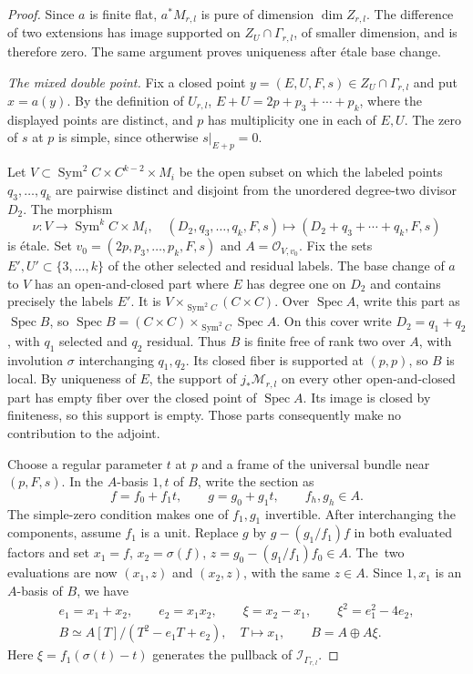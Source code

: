 \documentclass[11pt,letterpaper]{amsart}
\theoremstyle{plain}
\theoremstyle{definition}
\theoremstyle{remark}
\numberwithin{equation}{section}
\DeclareMathOperator{\Spec}{Spec}
\DeclareMathOperator{\Sym}{Sym}
\begin{document}
\begin{proof}
Since $a$ is finite flat, $a^*M_{r,l}$ is pure of dimension
$\dim Z_{r,l}$. The difference of two extensions has
image supported on $Z_U\cap\Gamma_{r,l}$, of smaller dimension,
and is therefore zero. The same argument proves uniqueness after
\'etale base change.

\smallskip
\noindent\textit{The mixed double point.}
Fix a closed point $y=(E,U,F,s)\in Z_U\cap\Gamma_{r,l}$
and put $x=a(y)$.
By the definition of $U_{r,l}$,
$
 E+U=2p+p_3+\cdots+p_k$,
where the displayed  points are distinct, and $p$ has
multiplicity one in each of $E,U$. The zero of $s$ at $p$ is
simple, since otherwise $s|_{E+p}=0$.

Let $V\subset\Sym^2C\times C^{k-2}\times M_i$ be the open subset
on which the labeled points $q_3,\ldots,q_k$ are pairwise distinct
and disjoint from the unordered degree-two divisor $D_2$.
The morphism
\[
 \nu:V\longrightarrow\Sym^kC\times M_i,\quad
 (D_2,q_3,\ldots,q_k,F,s)\longmapsto
 (D_2+q_3+\cdots+q_k,F,s)
\]
is \'etale. Set $v_0=(2p,p_3,\ldots,p_k,F,s)$ and
$A=\mathcal O_{V,v_0}$. Fix the sets $E',U'\subset\{3,\ldots,k\}$
of the other selected and residual labels.
The base change of $a$ to $V$ has an open-and-closed part where
$E$ has degree one on $D_2$ and contains precisely the labels $E'$.
It is $V\times_{\Sym^2C}(C\times C)$. Over $\Spec A$, write this part
as $\Spec B$, so
$
 \Spec B=(C\times C)\times_{\Sym^2C}\Spec A$.
On this cover write $D_2=q_1+q_2$, with $q_1$ selected and $q_2$
residual. Thus $B$ is finite free of rank two over $A$, with involution
$\sigma$ interchanging $q_1,q_2$. Its closed fiber is supported at
$(p,p)$, so $B$ is local.
By uniqueness of $E$, the support of $j_*\mathscr M_{r,l}$ on every
other open-and-closed part has empty fiber over the closed point of
$\Spec A$. Its image is closed by finiteness, so this support is
empty. Those parts consequently make no contribution to the adjoint.


Choose a regular parameter $t$ at $p$ and a frame of the universal
bundle near $(p,F,s)$. In the $A$-basis $1,t$ of $B$, write the section as
\[
 f=f_0+f_1t,\qquad g=g_0+g_1t,\qquad f_h,g_h\in A.
\]
The simple-zero condition makes one of $f_1,g_1$ invertible.
After interchanging the components, assume $f_1$ is a unit.
Replace $g$ by $g-(g_1/f_1)f$ in both evaluated factors and set
$x_1=f$, $x_2=\sigma(f)$,
$z=g_0-(g_1/f_1)f_0\in A$.
The~two evaluations are now $(x_1,z)$ and $(x_2,z)$, with the same
$z\in A$. Since $1,x_1$ is an $A$-basis of $B$, we have
\begin{equation}\label{eq:prop512-quadratic-algebra}
 \begin{gathered}
 e_1=x_1+x_2,\qquad e_2=x_1x_2,\qquad \xi=x_2-x_1,\qquad
 \xi^2=e_1^2-4e_2,\\
 B\simeq A[T]/(T^2-e_1T+e_2),\quad T\longmapsto x_1,
 \qquad B=A\oplus A\xi.
 \end{gathered}
\end{equation}
Here $\xi=f_1(\sigma(t)-t)$ generates the pullback of
$\mathcal I_{\Gamma_{r,l}}$.


\end{proof}
\end{document}
